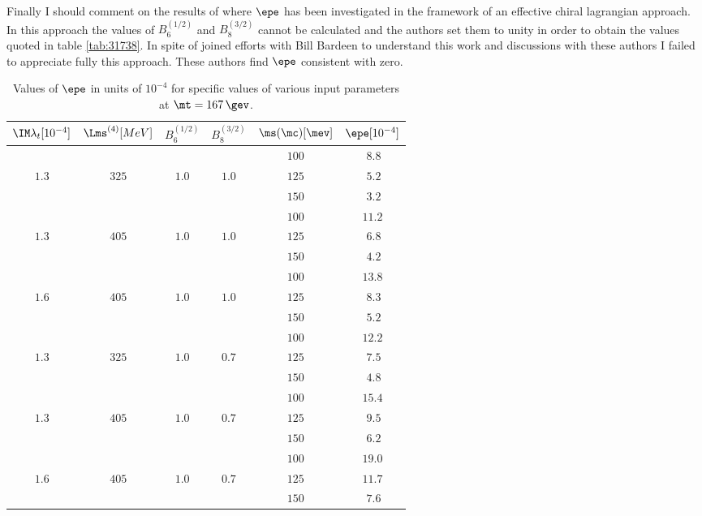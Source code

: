 Finally I should comment on the results of \cite{BELKOV} where
$\epe$ has been investigated in the framework of an effective chiral
lagrangian approach. In this approach the values of
$B_6^{(1/2)}$ and $B_8^{(3/2)}$ cannot be calculated and the authors
set them to unity in order to obtain the values quoted in table
\ref{tab:31738}. In spite of joined efforts with Bill Bardeen to
understand this work
and discussions with these authors I failed to appreciate fully this
approach. These authors find $\epe$ consistent
with zero.

\begin{table}[thb]
\caption[]{ Values of $\epe$ in units of $10^{-4}$ 
for specific values of various input parameters at $\mt=167\,\gev$. 
\label{tab:31731}}
\begin{center}
\begin{tabular}{|c|c|c|c|c||c|}\hline
  $\IM\lambda_t[10^{-4}]$& 
$\Lms^{(4)}[MeV]$& $B^{(1/2)}_6$& $B^{(3/2)}_8$ & 
$\ms(\mc)[\mev]$ &
 $\epe[10^{-4}]$ \\ \hline
       &       &      &     & $100$ & $~8.8$ \\
$1.3$ & $325$ & $1.0$&$1.0$& $125$ & $~5.2$ \\
       &       &      &     & $150$ & $~3.2$ \\
 \hline
       &       &      &     & $100$ & $11.2$ \\
$1.3$ & $405$ & $1.0$&$1.0$ & $125$ & $~6.8$ \\
       &       &      &     & $150$ & $~4.2$ \\
 \hline
       &       &      &     & $100$ & $13.8$ \\
$1.6$ & $405$ & $1.0$&$1.0$ & $125$ & $~8.3$ \\
       &       &      &     & $150$ & $~5.2$ \\
 \hline\hline
       &       &      &     & $100$ & $12.2$ \\
$1.3$ & $325$ & $1.0$&$0.7$ & $125$ & $~7.5$ \\
       &       &      &     & $150$ & $~4.8$ \\
 \hline
       &       &      &     & $100$ & $15.4$ \\
$1.3$ & $405$ &$1.0$&$0.7$ & $125$ & $~9.5$ \\
       &       &      &     & $150$ & $~6.2$ \\
 \hline
       &       &      &     & $100$ & $19.0$ \\
$1.6$ & $405$ &$1.0$&$0.7$ & $125$ & $11.7$ \\
       &       &      &     & $150$ & $~7.6$ \\
 \hline
\end{tabular}
\end{center}
\end{table}

